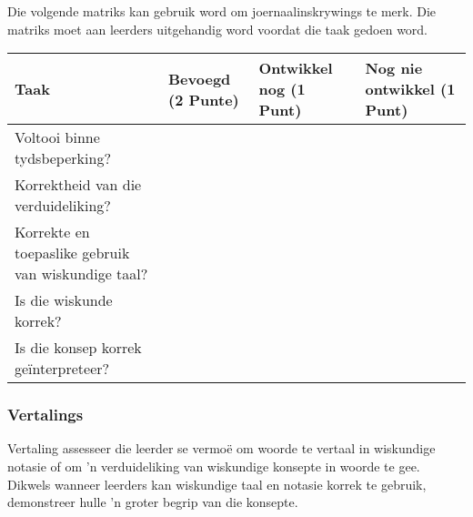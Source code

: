 Die volgende matriks kan gebruik word om joernaalinskrywings te
merk. Die matriks moet aan leerders uitgehandig word voordat die taak
gedoen word.
\begin{table}[H]
 \begin{center}
  \begin{tabular}{|p{4cm}|p{2cm}|p{2.5cm}|p{3cm}|} \hline
  \textbf{Taak} & \textbf{Bevoegd \newline(2 Punte)} & \textbf{Ontwikkel nog \newline(1 Punt)}& \textbf{Nog nie ontwikkel \newline (1 Punt)}\\ \hline
Voltooi binne tydsbeperking? &&&\\ \hline
Korrektheid van die verduideliking? &&&\\ \hline
Korrekte en toepaslike gebruik van wiskundige taal? &&&\\ \hline
Is die wiskunde korrek? &&&\\ \hline
Is die konsep korrek geïnterpreteer?&&&\\ \hline

  \end{tabular}

 \end{center}

\end{table}

\subsubsection{Vertalings}
Vertaling assesseer die leerder se vermoë om woorde te vertaal in
wiskundige notasie of om 'n verduideliking van wiskundige konsepte in
woorde te gee. Dikwels wanneer leerders kan wiskundige taal en notasie
korrek te gebruik, demonstreer hulle 'n groter begrip van die
konsepte.

